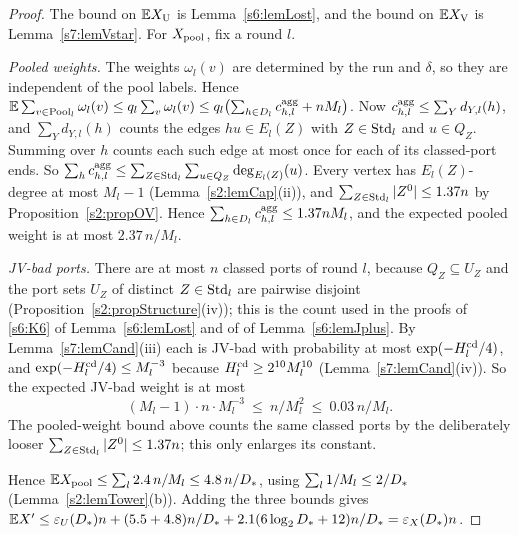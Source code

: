 \begin{proof}
The bound on $\mathbb{E}X_{\mathrm{U}}$ is Lemma~\ref{s6:lemLost}, and the bound on $\mathbb{E}X_{\mathrm{V}}$ is
Lemma~\ref{s7:lemVstar}. For $X_{\mathrm{pool}}$, fix a round $l$.

\emph{Pooled weights.} The weights $\omega_l(v)$ are determined by the run and
$\delta$, so they are independent of the pool labels. Hence
$\mathbb{E}\sum_{v\in\mathrm{Pool}_l}\omega_l(v)\le q_l\sum_v\omega_l(v)\le q_l\bigl(\sum_{h\in D_l}c^{\mathrm{agg}}_{h,l}+nM_l\bigr)$.
Now $c^{\mathrm{agg}}_{h,l}\le\sum_Yd_{Y,l}(h)$, and $\sum_Yd_{Y,l}(h)$ counts the edges
$hu\in E_l(Z)$ with $Z\in\mathrm{Std}_l$ and $u\in Q_Z$. Summing over $h$ counts each such
edge at most once for each of its classed-port ends. So
$\sum_hc^{\mathrm{agg}}_{h,l}\le\sum_{Z\in\mathrm{Std}_l}\sum_{u\in Q_Z}\deg_{E_l(Z)}(u)$. Every
vertex has $E_l(Z)$-degree at most $M_l-1$ (Lemma~\ref{s2:lemCap}(ii)), and
$\sum_{Z\in\mathrm{Std}_l}|Z^0|\le1.37n$ by Proposition~\ref{s2:propOV}. Hence
$\sum_{h\in D_l}c^{\mathrm{agg}}_{h,l}\le1.37nM_l$, and the expected pooled weight is at
most $2.37\,n/M_l$.

\emph{JV-bad ports.} There are at most $n$ classed ports of round $l$, because
$Q_Z\subseteq U_Z$ and the port sets $U_Z$ of distinct $Z\in\mathrm{Std}_l$ are pairwise
disjoint (Proposition~\ref{s2:propStructure}(iv)); this is the count used in
the proofs of \ref{s6:K6} of Lemma~\ref{s6:lemLost} and of  of
Lemma~\ref{s6:lemJplus}. By Lemma~\ref{s7:lemCand}(iii) each is JV-bad with
probability at most $\exp(-H^{\mathrm{cd}}_l/4)$, and $\exp(-H^{\mathrm{cd}}_l/4)\le M_l^{-3}$ because
$H^{\mathrm{cd}}_l\ge2^{10}M_l^{10}$ (Lemma~\ref{s7:lemCand}(iv)). So the expected JV-bad
weight is at most
\[
(M_l-1)\cdot n\cdot M_l^{-3}\ \le\ n/M_l^2\ \le\ 0.03\,n/M_l .
\]
The pooled-weight bound above counts the same classed ports by the
deliberately looser $\sum_{Z\in\mathrm{Std}_l}|Z^0|\le1.37n$; this only enlarges its
constant.

Hence $\mathbb{E}X_{\mathrm{pool}}\le\sum_l2.4\,n/M_l\le4.8\,n/D_{*}$, using
$\sum_l1/M_l\le2/D_{*}$ (Lemma~\ref{s2:lemTower}(b)). Adding the three bounds
gives $\mathbb{E}X'\le\varepsilon_{U}(D_{*})n+(5.5+4.8)n/D_{*}+2.1(6\log_2D_{*}+12)n/D_{*}=\varepsilon_{X}(D_{*})n$.
\end{proof}


